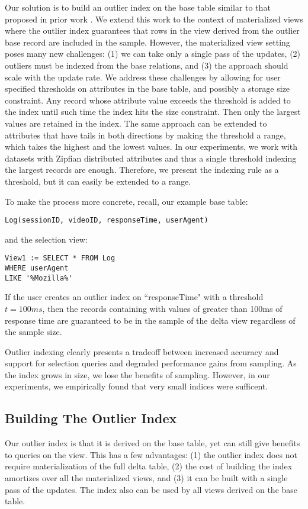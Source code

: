 Our solution is to build an outlier index on the base table similar to that proposed in prior work \cite{chaudhuri2001overcoming}.
We extend this work to the context of materialized views where the outlier index guarantees
that rows in the view derived from the outlier base record are included in the sample.
However, the materialized view setting poses many new challenges: (1) we can take only
a single pass of the updates, (2) outliers must be indexed from the base relations, and
(3) the approach should scale with the update rate.
We address these challenges by allowing for user specified thresholds on attributes in the base table, and possibly a storage size constraint.
Any record whose attribute value exceeds the threshold is added to the index until such time the index hits the size constraint.
Then only the largest values are retained in the index.
The same approach can be extended to attributes that have tails in both directions by making the threshold a range, which takes the highest and the lowest
values.
In our experiments, we work with datasets with Zipfian distributed attributes and thus a single threshold indexing the largest records are enough.
Therefore, we present the indexing rule as a threshold, but it can easily be extended to a range.

To make the process more concrete, recall, our example base table:
\begin{lstlisting}
Log(sessionID, videoID, responseTime, userAgent)
\end{lstlisting}
and the selection view:
\begin{lstlisting}
View1 := SELECT * FROM Log 
WHERE userAgent 
LIKE '%Mozilla%'
\end{lstlisting}
If the user creates an outlier index on ``responseTime" with a threshold $t=100ms$, then
the records containing with values of greater than 100ms of response time are guaranteed to be 
in the sample of the delta view regardless of the sample size.

Outlier indexing clearly presents a tradeoff between increased accuracy and support for selection queries and degraded performance gains from sampling. 
As the index grows in size, we lose the benefits of sampling.
However, in our experiments, we empirically found that very small indices were sufficent.

\subsection{Building The Outlier Index}
Our outlier index is that it is derived on the base table, yet 
can still give benefits to queries on the view.
This has a few advantages: (1) the outlier index does not require materialization of the full delta table,
(2) the cost of building the index amortizes over all the materialized views, and (3) it can be built with a 
single pass of the updates.
The index also can be used by all views derived on the base table.

